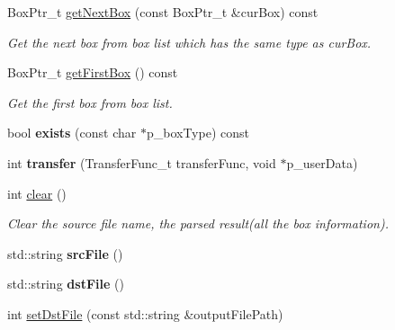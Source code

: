 \begin{DoxyCompactItemize}
Box\+Ptr\+\_\+t \mbox{\hyperlink{classmp4_parser_1_1_m_p4_parser_a3ca2c14303ef53c0e3a2abe72d22c017}{get\+Next\+Box}} (const Box\+Ptr\+\_\+t \&cur\+Box) const
\begin{DoxyCompactList}\small\item\em Get the next box from box list which has the same type as cur\+Box. \end{DoxyCompactList}\item 
Box\+Ptr\+\_\+t \mbox{\hyperlink{classmp4_parser_1_1_m_p4_parser_a06442051ce3c360ab2842d5a2872989b}{get\+First\+Box}} () const
\begin{DoxyCompactList}\small\item\em Get the first box from box list. \end{DoxyCompactList}\item 
\mbox{\label{classmp4_parser_1_1_m_p4_parser_a8c9f66c274d356b51afe9b62df9b7cf3}} 
bool {\bfseries exists} (const char $\ast$p\+\_\+box\+Type) const
\item 
\mbox{\label{classmp4_parser_1_1_m_p4_parser_af0e4d62b198de686c320271d327b02c7}} 
int {\bfseries transfer} (Transfer\+Func\+\_\+t transfer\+Func, void $\ast$p\+\_\+user\+Data)
\item 
\mbox{\label{classmp4_parser_1_1_m_p4_parser_af1f298af86932b58b3677722b49736c0}} 
int \mbox{\hyperlink{classmp4_parser_1_1_m_p4_parser_af1f298af86932b58b3677722b49736c0}{clear}} ()
\begin{DoxyCompactList}\small\item\em Clear the source file name, the parsed result(all the box information). \end{DoxyCompactList}\item 
\mbox{\label{classmp4_parser_1_1_m_p4_parser_ad62a065a468987b648eedaba718f8a0d}} 
std\+::string {\bfseries src\+File} ()
\item 
\mbox{\label{classmp4_parser_1_1_m_p4_parser_a637db83f72f76903625b82ea8d3a3560}} 
std\+::string {\bfseries dst\+File} ()
\item 
int \mbox{\hyperlink{classmp4_parser_1_1_m_p4_parser_ac5ac99898f7161ebcf828c6f8be2f32a}{set\+Dst\+File}} (const std\+::string \&output\+File\+Path)

\end{DoxyCompactItemize}
